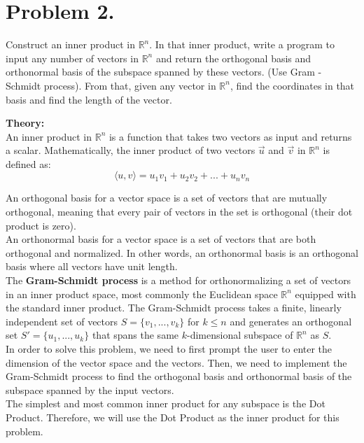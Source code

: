 \clearpage
\section{ Problem 2.}
Construct an inner product in $\mathbb{R}^n$. 
In that inner product, write a program to input any number of vectors in $\mathbb{R}^n$ and return the orthogonal
basis and orthonormal basis of the subspace spanned by these vectors. (Use Gram - Schmidt process). From that, given any vector in $\mathbb{R}^n$, find the coordinates in that basis and find the length of the vector.

\vspace*{1cm}

\textbf{Theory:}\\[6pt]
An inner product in $ \mathbb{R}^n $ is a function that takes two vectors as input and returns a scalar. Mathematically, the inner product of two vectors $ \vec{u} $ and $ \vec{v} $ in $ \mathbb{R}^n $ is defined as:
$$ \langle u, v \rangle = u_1v_1 + u_2v_2 + ... + u_nv_n $$

An orthogonal basis for a vector space is a set of vectors that are mutually orthogonal, meaning that every pair of vectors in the set is orthogonal (their dot product is zero). \\[6pt]
An orthonormal basis for a vector space is a set of vectors that are both orthogonal and normalized. In other words, an orthonormal basis is an orthogonal basis where all vectors have unit length. \\[6pt]
The \textbf{Gram-Schmidt process} is a method for orthonormalizing a set of vectors in an inner product space, most commonly the Euclidean space $\mathbb{R}^n$ equipped with the standard inner product. The Gram-Schmidt process takes a finite, linearly independent set of vectors $S = \{v_1, ..., v_k\}$ for $ k \leq n$ and generates an orthogonal set $S' = \{u_1, ..., u_k\}$ that spans the same $k$-dimensional subspace of $\mathbb{R}^n$ as $S$.\\[6pt]

In order to solve this problem, we need to first prompt the user to enter the dimension of the vector space and the vectors. Then, we need to implement the Gram-Schmidt process to find the orthogonal basis and orthonormal basis of the subspace spanned by the input vectors.\\[6pt]
The simplest and most common inner product for any subspace is the Dot Product. Therefore, we will use the Dot Product as the inner product for this problem.

